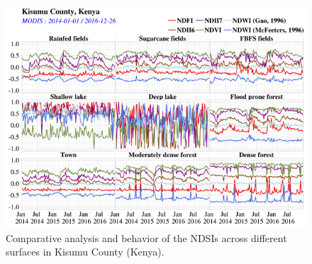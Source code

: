 \documentclass[12pt,oneside]{article}
\begin{document}
\begin{figure}
\includegraphics[width=1\linewidth]{figures/Mapping_FBFS_ndsi_comparaison} \caption{Comparative analysis and behavior of the NDSIs across different surfaces in Kisumu County (Kenya).}\label{fig:fig3}
\end{figure}
\end{document}
